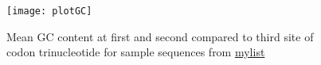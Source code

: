 \begin{figure}[tb] 
\centering 
\texttt{[image: plotGC]} 
\caption[GC percentage at synonymous sites]{Mean GC content at first and second compared to third site of codon trinucleotide for sample sequences from \hyperlink{function:mylist}{mylist}}
\label{fig:plotGC} 
\end{figure} 



